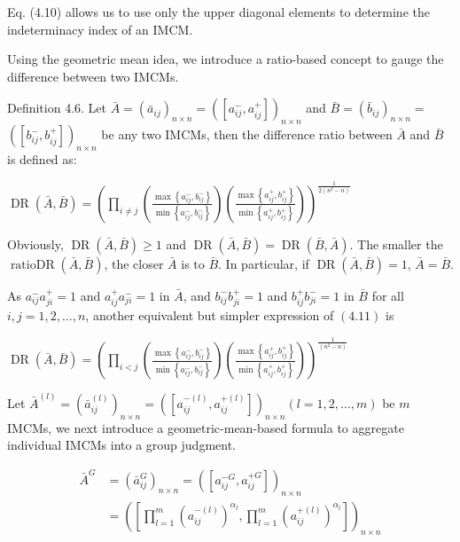 \documentclass[10pt]{article}
\begin{document}
Eq. (4.10) allows us to use only the upper diagonal elements to determine the indeterminacy index of an IMCM.

Using the geometric mean idea, we introduce a ratio-based concept to gauge the difference between two IMCMs.

Definition 4.6. Let $\bar{A}=\left(\bar{a}_{i j}\right)_{n \times n}=\left(\left[a_{i j}^{-}, a_{i j}^{+}\right]\right)_{n \times n}$ and $\bar{B}=\left(\bar{b}_{i j}\right)_{n \times n}=$ $\left(\left[b_{i j}^{-}, b_{i j}^{+}\right]\right)_{n \times n}$ be any two IMCMs, then the difference ratio between $\bar{A}$ and $\bar{B}$ is defined as:

$\operatorname{DR}(\bar{A}, \bar{B})=\left(\prod_{i \neq j}\left(\frac{\max \left\{a_{i j}^{-}, b_{i j}^{-}\right\}}{\min \left\{a_{i j}^{-}, b_{i j}^{-}\right\}}\right)\left(\frac{\max \left\{a_{i j}^{+}, b_{i j}^{+}\right\}}{\min \left\{a_{i j}^{+}, b_{i j}^{+}\right\}}\right)\right)^{\frac{1}{2\left(n^{2}-n\right)}}$

Obviously, $\operatorname{DR}(\bar{A}, \bar{B}) \geq 1$ and $\operatorname{DR}(\bar{A}, \bar{B})=\operatorname{DR}(\bar{B}, \bar{A})$. The smaller the $\operatorname{ratioDR}(\bar{A}, \bar{B})$, the closer $\bar{A}$ is to $\bar{B}$. In particular, if $\operatorname{DR}(\bar{A}, \bar{B})=1$, $\bar{A}=\bar{B}$.

As $a_{i j}^{-} a_{j i}^{+}=1$ and $a_{i j}^{+} a_{j i}^{-}=1$ in $\bar{A}$, and $b_{i j}^{-} b_{j i}^{+}=1$ and $b_{i j}^{+} b_{j i}^{-}=1$ in $\bar{B}$ for all $i, j=1,2, \ldots, n$, another equivalent but simpler expression of $(4.11)$ is

$\operatorname{DR}(\bar{A}, \bar{B})=\left(\prod_{i<j}\left(\frac{\max \left\{a_{i j}^{-}, b_{i j}^{-}\right\}}{\min \left\{a_{i j}^{-}, b_{i j}^{-}\right\}}\right)\left(\frac{\max \left\{a_{i j}^{+}, b_{i j}^{+}\right\}}{\min \left\{a_{i j}^{+}, b_{i j}^{+}\right\}}\right)\right)^{\frac{1}{\left(n^{2}-n\right)}}$

Let $\bar{A}^{(l)}=\left(\bar{a}_{i j}^{(l)}\right)_{n \times n}=\left(\left[a_{i j}^{-(l)}, a_{i j}^{+(l)}\right]\right)_{n \times n}(l=1,2, \ldots, m)$ be $m$ IMCMs, we next introduce a geometric-mean-based formula to aggregate individual IMCMs into a group judgment.

$$
\begin{aligned}
\bar{A}^{G} & =\left(\bar{a}_{i j}^{G}\right)_{n \times n}=\left(\left[a_{i j}^{-G}, a_{i j}^{+G}\right]\right)_{n \times n} \\
& =\left(\left[\prod_{l=1}^{m}\left(a_{i j}^{-(l)}\right)^{\alpha_{l}}, \prod_{l=1}^{m}\left(a_{i j}^{+(l)}\right)^{\alpha_{l}}\right]\right)_{n \times n}
\end{aligned}
$$
\end{document}
